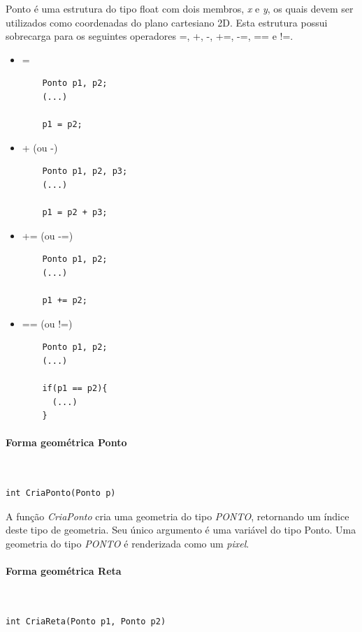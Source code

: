 Ponto é uma estrutura do tipo float com dois membros, \emph{x} e \emph{y}, os quais devem ser utilizados como coordenadas do plano cartesiano 2D. Esta estrutura possui sobrecarga para os seguintes operadores =, +, -, +=, -=, == e !=.
\begin{itemize}
  \item =
    \begin{lstlisting}
    Ponto p1, p2;
    (...)

    p1 = p2;
    \end{lstlisting}
   \item + (ou -)
    \begin{lstlisting}
    Ponto p1, p2, p3;
    (...)

    p1 = p2 + p3;
    \end{lstlisting} 
     \item += (ou -=)
    \begin{lstlisting}
    Ponto p1, p2;
    (...)

    p1 += p2;
    \end{lstlisting}

     \item == (ou !=)
    \begin{lstlisting}
    Ponto p1, p2;
    (...)

    if(p1 == p2){
      (...)
    }
    \end{lstlisting}
\end{itemize}

\paragraph{Forma geométrica Ponto}\mbox{}\\

 
\begin{lstlisting}
int CriaPonto(Ponto p)
\end{lstlisting}


A função \emph{CriaPonto} cria uma geometria do tipo \emph{PONTO}, retornando um índice deste tipo de geometria. Seu único argumento é uma variável do tipo Ponto. Uma geometria do tipo \emph{PONTO} é renderizada como um \emph{pixel}.

\paragraph{Forma geométrica Reta}\mbox{}\\

 
\begin{lstlisting} 
int CriaReta(Ponto p1, Ponto p2)
\end{lstlisting}


